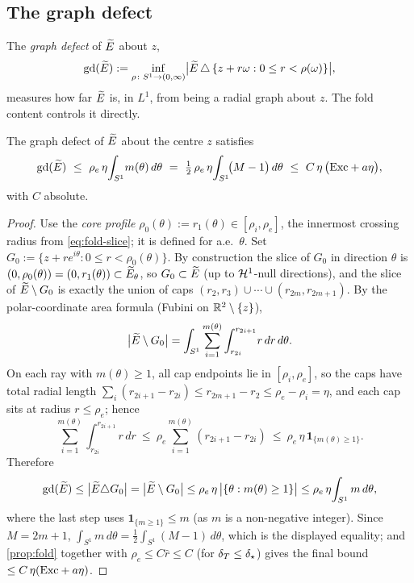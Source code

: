 \subsection{The graph defect}

The \emph{graph defect} of $\widetilde{E}$ about $z$,
\[
   \mathrm{gd}(\widetilde{E}):=\inf_{\rho\colon S^1\to(0,\infty)}
      \bigl|\widetilde{E}\,\triangle\,\{z+r\omega:0\le r<\rho(\omega)\}\bigr|,
\]
measures how far $\widetilde{E}$ is, in $L^1$, from being a radial graph about $z$.
The fold content controls it directly.

\begin{corollary}\label{cor:gd}
The graph defect of $\widetilde{E}$ about the centre $z$ satisfies
\begin{equation}\label{eq:gd}
   \mathrm{gd}(\widetilde{E})\ \le\ \rho_e\,\eta\!\int_{S^1}\!m(\theta)\,d\theta
   \ =\ \tfrac12\,\rho_e\,\eta\!\int_{S^1}\!\bigl(M-1\bigr)\,d\theta
   \ \le\ C\,\eta\,\bigl(\mathrm{Exc}+a\eta\bigr),
\end{equation}
with $C$ absolute.
\end{corollary}

\begin{proof}
Use the \emph{core profile} $\rho_0(\theta):=r_1(\theta)\in[\rho_i,\rho_e]$,
the innermost crossing radius from \eqref{eq:fold-slice}; it is defined for
a.e.\ $\theta$. Set
$G_0:=\{z+r e^{i\theta}:0\le r<\rho_0(\theta)\}$. By construction the slice
of $G_0$ in direction $\theta$ is $(0,\rho_0(\theta))=(0,r_1(\theta))
\subset\widetilde{E}_\theta$, so $G_0\subset\widetilde{E}$ (up to $\mathcal{H}^1$-null directions),
and the slice of $\widetilde{E}\setminus G_0$ is exactly the union of caps
$(r_2,r_3)\cup\cdots\cup(r_{2m},r_{2m+1})$. By the polar-coordinate area
formula (Fubini on $\mathbb{R}^2\setminus\{z\}$),
\[
   \bigl|\widetilde{E}\setminus G_0\bigr|
   =\int_{S^1}\sum_{i=1}^{m(\theta)}\int_{r_{2i}}^{r_{2i+1}}\!r\,dr\,d\theta .
\]
On each ray with $m(\theta)\ge1$, all cap endpoints lie in $[\rho_i,\rho_e]$,
so the caps have total radial length $\sum_i(r_{2i+1}-r_{2i})\le
r_{2m+1}-r_2\le\rho_e-\rho_i=\eta$, and each cap sits at radius
$r\le\rho_e$; hence
\[
   \sum_{i=1}^{m(\theta)}\int_{r_{2i}}^{r_{2i+1}}\!r\,dr
   \ \le\ \rho_e\sum_{i=1}^{m(\theta)}(r_{2i+1}-r_{2i})
   \ \le\ \rho_e\,\eta\,\mathbf1_{\{m(\theta)\ge1\}}.
\]
Therefore
\[
   \mathrm{gd}(\widetilde{E})\le\bigl|\widetilde{E}\triangle G_0\bigr|=\bigl|\widetilde{E}\setminus G_0\bigr|
   \le\rho_e\,\eta\,\bigl|\{\theta:m(\theta)\ge1\}\bigr|
   \le\rho_e\,\eta\!\int_{S^1}m\,d\theta,
\]
where the last step uses $\mathbf1_{\{m\ge1\}}\le m$ (as $m$ is a
non-negative integer). Since $M=2m+1$, $\int_{S^1}m\,d\theta=\tfrac12
\int_{S^1}(M-1)\,d\theta$, which is the displayed equality; and
\cref{prop:fold} together with $\rho_e\le C\hat r\le C$ (for
$\delta_T\le\delta_\star$) gives the final bound
$\le C\,\eta(\mathrm{Exc}+a\eta)$.
\end{proof}

